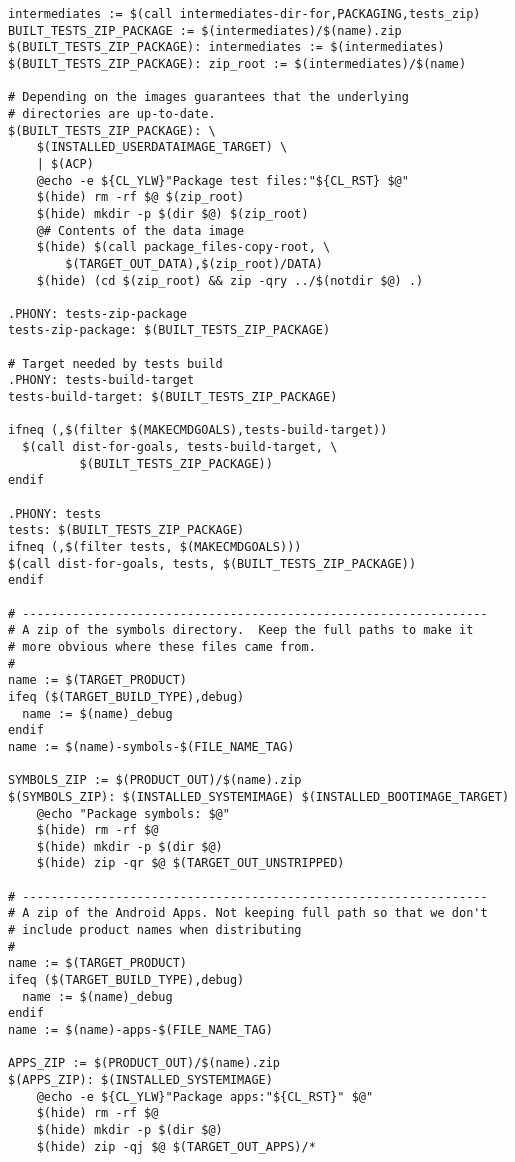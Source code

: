 \documentclass[12pt,a4paper]{article}
\begin{document}
\begin{verbatim}
intermediates := $(call intermediates-dir-for,PACKAGING,tests_zip)
BUILT_TESTS_ZIP_PACKAGE := $(intermediates)/$(name).zip
$(BUILT_TESTS_ZIP_PACKAGE): intermediates := $(intermediates)
$(BUILT_TESTS_ZIP_PACKAGE): zip_root := $(intermediates)/$(name)

# Depending on the images guarantees that the underlying
# directories are up-to-date.
$(BUILT_TESTS_ZIP_PACKAGE): \
    $(INSTALLED_USERDATAIMAGE_TARGET) \
    | $(ACP)
	@echo -e ${CL_YLW}"Package test files:"${CL_RST} $@"
	$(hide) rm -rf $@ $(zip_root)
	$(hide) mkdir -p $(dir $@) $(zip_root)
	@# Contents of the data image
	$(hide) $(call package_files-copy-root, \
		$(TARGET_OUT_DATA),$(zip_root)/DATA)
	$(hide) (cd $(zip_root) && zip -qry ../$(notdir $@) .)

.PHONY: tests-zip-package
tests-zip-package: $(BUILT_TESTS_ZIP_PACKAGE)

# Target needed by tests build
.PHONY: tests-build-target
tests-build-target: $(BUILT_TESTS_ZIP_PACKAGE)

ifneq (,$(filter $(MAKECMDGOALS),tests-build-target))
  $(call dist-for-goals, tests-build-target, \
          $(BUILT_TESTS_ZIP_PACKAGE))
endif

.PHONY: tests
tests: $(BUILT_TESTS_ZIP_PACKAGE)
ifneq (,$(filter tests, $(MAKECMDGOALS)))
$(call dist-for-goals, tests, $(BUILT_TESTS_ZIP_PACKAGE))
endif

# -----------------------------------------------------------------
# A zip of the symbols directory.  Keep the full paths to make it
# more obvious where these files came from.
#
name := $(TARGET_PRODUCT)
ifeq ($(TARGET_BUILD_TYPE),debug)
  name := $(name)_debug
endif
name := $(name)-symbols-$(FILE_NAME_TAG)

SYMBOLS_ZIP := $(PRODUCT_OUT)/$(name).zip
$(SYMBOLS_ZIP): $(INSTALLED_SYSTEMIMAGE) $(INSTALLED_BOOTIMAGE_TARGET)
	@echo "Package symbols: $@"
	$(hide) rm -rf $@
	$(hide) mkdir -p $(dir $@)
	$(hide) zip -qr $@ $(TARGET_OUT_UNSTRIPPED)

# -----------------------------------------------------------------
# A zip of the Android Apps. Not keeping full path so that we don't
# include product names when distributing
#
name := $(TARGET_PRODUCT)
ifeq ($(TARGET_BUILD_TYPE),debug)
  name := $(name)_debug
endif
name := $(name)-apps-$(FILE_NAME_TAG)

APPS_ZIP := $(PRODUCT_OUT)/$(name).zip
$(APPS_ZIP): $(INSTALLED_SYSTEMIMAGE)
	@echo -e ${CL_YLW}"Package apps:"${CL_RST}" $@"
	$(hide) rm -rf $@
	$(hide) mkdir -p $(dir $@)
	$(hide) zip -qj $@ $(TARGET_OUT_APPS)/*



\end{verbatim}
\end{document}
